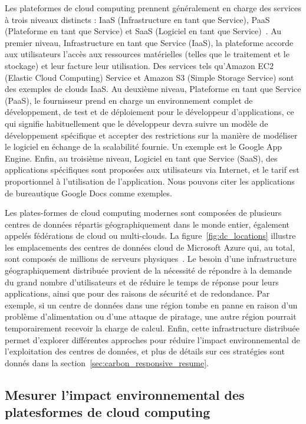 Les plateformes de cloud computing prennent généralement en charge des services à trois niveaux distincts : IaaS (Infrastructure en tant que Service), PaaS (Plateforme en tant que Service) et SaaS (Logiciel en tant que Service)~\citep{fos08}. Au premier niveau, Infrastructure en tant que Service (IaaS), la plateforme accorde aux utilisateurs l'accès aux ressources matérielles (telles que le traitement et le stockage) et leur facture leur utilisation. Des services tels qu'Amazon EC2 (Elastic Cloud Computing) Service et Amazon S3 (Simple Storage Service) sont des exemples de clouds IaaS. Au deuxième niveau, Plateforme en tant que Service (PaaS), le fournisseur prend en charge un environnement complet de développement, de test et de déploiement pour le développeur d'applications, ce qui signifie habituellement que le développeur devra suivre un modèle de développement spécifique et accepter des restrictions sur la manière de modéliser le logiciel en échange de la scalabilité fournie. Un exemple est le Google App Engine. Enfin, au troisième niveau, Logiciel en tant que Service (SaaS), des applications spécifiques sont proposées aux utilisateurs via Internet, et le tarif est proportionnel à l'utilisation de l'application. Nous pouvons citer les applications de bureautique Google Docs comme exemples.


Les plates-formes de cloud computing modernes sont composées de plusieurs centres de données répartis géographiquement dans le monde entier, également appelés fédérations de cloud ou multi-clouds. La figure~\ref{fig:dc_locations} illustre les emplacements des centres de données cloud de Microsoft Azure qui, au total, sont composés de millions de serveurs physiques~\cite{roach2021_microsoftazure}. Le besoin d'une infrastructure géographiquement distribuée provient de la nécessité de répondre à la demande du grand nombre d'utilisateurs et de réduire le temps de réponse pour leurs applications, ainsi que pour des raisons de sécurité et de redondance. Par exemple, si un centre de données dans une région tombe en panne en raison d'un problème d'alimentation ou d'une attaque de piratage, une autre région pourrait temporairement recevoir la charge de calcul. Enfin, cette infrastructure distribuée permet d'explorer différentes approches pour réduire l'impact environnemental de l'exploitation des centres de données, et plus de détails sur ces stratégies sont donnés dans la section~\ref{sec:carbon_responsive_resume}.


\subsection{Mesurer l'impact environnemental des platesformes de cloud computing}

